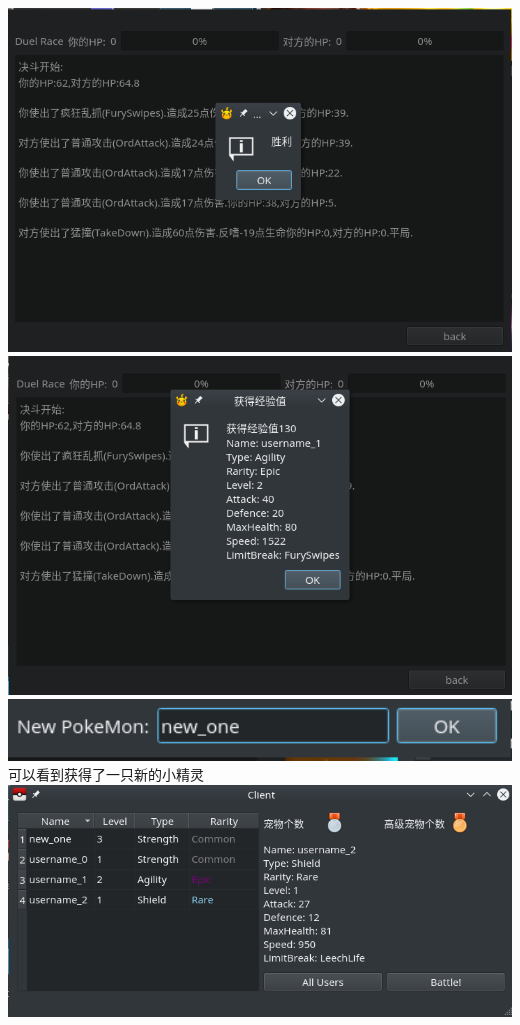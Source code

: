 \documentclass{article}
\begin{document}
\begin{itemize}
\begin{itemize}
\begin{center}
    \includegraphics[width=14cm]{./pokemon/战斗胜利.png}
    \includegraphics[width=14cm]{./pokemon/获得经验值.png}
    \includegraphics[width=14cm]{./pokemon/获得小精灵.png}
    可以看到获得了一只新的小精灵\\
    \includegraphics[width=14cm]{./pokemon/获得后.png}

\end{center}
\end{itemize}
\end{itemize}
\end{document}
